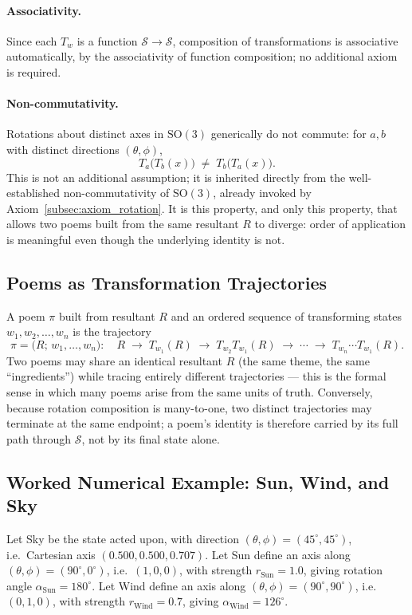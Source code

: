 \documentclass[12pt, a4paper]{article}
\begin{document}
\paragraph{Associativity.} Since each $T_w$ is a function
$\mathcal{S} \to \mathcal{S}$, composition of transformations is
associative automatically, by the associativity of function
composition; no additional axiom is required.

\paragraph{Non-commutativity.} Rotations about distinct axes in
$\mathrm{SO}(3)$ generically do not commute: for $a, b$ with distinct
directions $(\theta,\phi)$,
\begin{equation}
    T_a\big(T_b(x)\big) \;\neq\; T_b\big(T_a(x)\big).
    \label{eq:noncommute}
\end{equation}
This is not an additional assumption; it is inherited directly from
the well-established non-commutativity of $\mathrm{SO}(3)$, already
invoked by Axiom~\ref{subsec:axiom_rotation}. It is this property,
and only this property, that allows two poems built from the same
resultant $R$ to diverge: order of application is meaningful even
though the underlying identity is not.

\subsection{Poems as Transformation Trajectories}
\label{subsec:transform_trajectories}
A poem $\pi$ built from resultant $R$ and an ordered sequence of
transforming states $w_1, w_2, \ldots, w_n$ is the trajectory
\begin{equation}
    \pi = \big(R;\, w_1, \ldots, w_n\big): \quad
    R \;\longrightarrow\; T_{w_1}(R) \;\longrightarrow\; T_{w_2}T_{w_1}(R) \;\longrightarrow\; \cdots \;\longrightarrow\; T_{w_n}\cdots T_{w_1}(R).
    \label{eq:poem_trajectory}
\end{equation}
Two poems may share an identical resultant $R$ (the same theme, the
same ``ingredients'') while tracing entirely different trajectories
--- this is the formal sense in which many poems arise from the same
units of truth. Conversely, because rotation composition is
many-to-one, two distinct trajectories may terminate at the same
endpoint; a poem's identity is therefore carried by its full path
through $\mathcal{S}$, not by its final state alone.

\subsection{Worked Numerical Example: Sun, Wind, and Sky}
\label{subsec:transform_example}
Let Sky be the state acted upon, with direction
$(\theta,\phi) = (45^\circ, 45^\circ)$, i.e.\ Cartesian axis
$(0.500, 0.500, 0.707)$. Let Sun define an axis along
$(\theta,\phi) = (90^\circ, 0^\circ)$, i.e.\ $(1,0,0)$, with strength
$r_{\text{Sun}} = 1.0$, giving rotation angle $\alpha_{\text{Sun}} =
180^\circ$. Let Wind define an axis along $(\theta,\phi) = (90^\circ,
90^\circ)$, i.e.\ $(0,1,0)$, with strength $r_{\text{Wind}} = 0.7$,
giving $\alpha_{\text{Wind}} = 126^\circ$.
\end{document}
